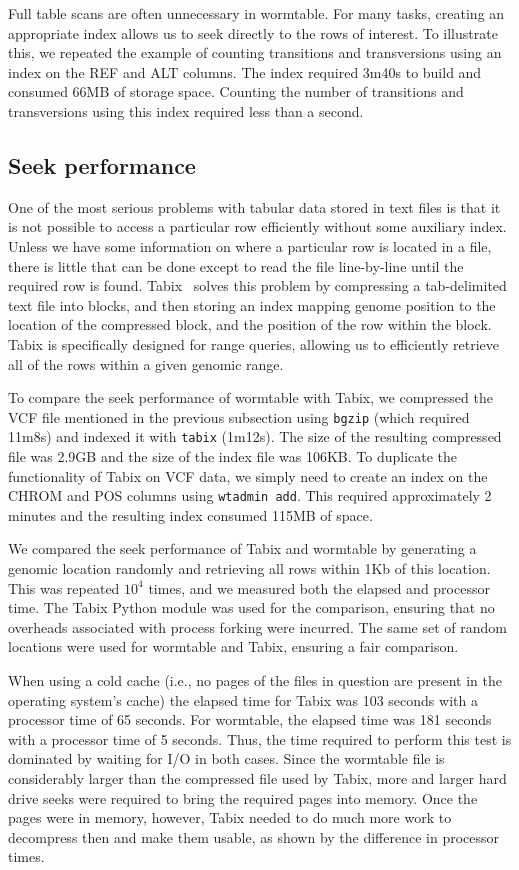 \documentclass[10pt]{bmc_article}
\newenvironment{bmcformat}{\begin{raggedright}\baselineskip20pt\sloppy\setboolean{publ}{false}}{\end{raggedright}\baselineskip20pt\sloppy}
\begin{document}
\begin{bmcformat}
Full table scans are often unnecessary in wormtable. For many tasks,
creating an appropriate index allows us to seek directly to the 
rows of interest. To illustrate this, we repeated the example 
of counting transitions and transversions using an index 
on the REF and ALT columns.
The index required 3m40s to build and 
consumed 66MB of storage space. Counting the number of 
transitions and transversions using this index required 
less than a second.

\subsection*{Seek performance}
One of the most serious problems with tabular data stored in text files
is that it is not possible to access a particular row 
efficiently without some auxiliary 
index. Unless we have some information on where a particular row is located
in a file, there is little that can be done except to read the file 
line-by-line until the required row is found. Tabix~\cite{li11} solves
this problem by compressing a tab-delimited text file into blocks, and 
then storing an index mapping genome position to the location 
of the compressed block, and the position of the row within the block.
Tabix is specifically designed for range queries, allowing us to 
efficiently retrieve all of the rows within a given genomic range.

To compare the seek performance of wormtable with Tabix, we compressed
the VCF file mentioned in the previous subsection using \texttt{bgzip}
(which required 11m8s) and indexed it with \texttt{tabix} (1m12s). 
The size of the resulting compressed file was 2.9GB and 
the size of the index file was 106KB.
To duplicate the functionality of Tabix on VCF data, we simply need to 
create an index on the CHROM and POS columns using \texttt{wtadmin add}. 
This required approximately
2 minutes and the resulting index consumed 115MB of space.

We compared the seek performance of Tabix and wormtable by generating 
a genomic location randomly and retrieving all rows within 1Kb of
this location. This 
was repeated $10^4$ times, and we measured both the elapsed and 
processor time. The Tabix Python module was used for the 
comparison, ensuring that no overheads associated with process 
forking were incurred. The same set of random locations were used 
for wormtable and Tabix, ensuring a fair comparison.

When using a cold cache (i.e., no pages of the files in question are 
present in the operating system's cache) the elapsed
time for Tabix was 103 seconds with a processor time of 65
seconds. For wormtable, the elapsed time was 181 seconds 
with a processor time of 5 seconds. Thus, the time required 
to perform this test is dominated by waiting for I/O in both 
cases. Since the wormtable file is considerably larger than the 
compressed file used by Tabix, more and larger hard drive
seeks were required 
to bring the required pages into memory. Once the 
pages were in memory, however, Tabix needed to do much more work to 
decompress then and make them usable, as shown by the 
difference in processor times.


\end{bmcformat}
\end{document}
